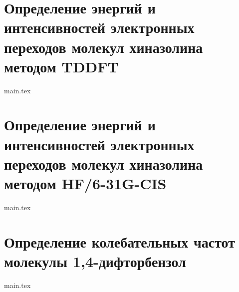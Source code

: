 \documentclass[12pt,a4paper]{article}
\begin{document}
\newpage
\section{Определение энергий и интенсивностей электронных переходов молекул хиназолина методом TDDFT}
{main.tex}

\newpage
\section{Определение энергий и интенсивностей электронных переходов молекул хиназолина методом HF/6-31G-CIS}
{main.tex}

\newpage
\section{Определение колебательных частот молекулы 1,4-дифторбензол}
{main.tex}

\newpage



\end{document}
